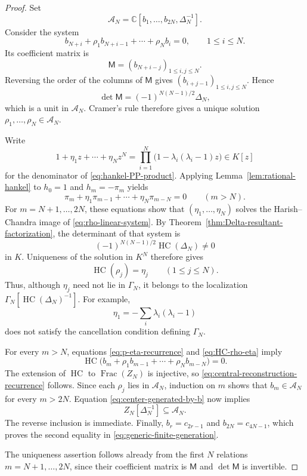 \documentclass[10pt,a4paper]{amsart}
\newcommand{\C}{\mathbb C}
\newcommand{\HC}{\operatorname{HC}}
\begin{document}
\begin{proof}
Set
\[
 \mathcal A_N
 =\C[b_1,\ldots,b_{2N},\Delta_N^{-1}].
\]
Consider the system
\begin{equation}
 b_{N+i}+\rho_1b_{N+i-1}+\cdots+\rho_Nb_i=0,
 \qquad 1\leq i\leq N.
 \label{eq:rho-linear-system}
\end{equation}
Its coefficient matrix is
\[
 \mathsf M=(b_{N+i-j})_{1\leq i,j\leq N}.
\]
Reversing the order of the columns of \(\mathsf M\) gives
\((b_{i+j-1})_{1\leq i,j\leq N}\).  Hence
\begin{equation}
 \det\mathsf M
 =(-1)^{N(N-1)/2}\Delta_N,
 \label{eq:M-determinant}
\end{equation}
which is a unit in \(\mathcal A_N\).  Cramer's rule therefore gives a
unique solution
\(\rho_1,\ldots,\rho_N\in\mathcal A_N\).

Write
\begin{equation}
 1+\eta_1z+\cdots+\eta_Nz^N
 =\prod_{i=1}^N
  \bigl(1-\lambda_i(\lambda_i-1)z\bigr)
 \in K[z]
 \label{eq:eta-denominator}
\end{equation}
for the denominator of \eqref{eq:hankel-PP-product}.  Applying
Lemma~\ref{lem:rational-hankel} to
\(h_0=1\) and \(h_m=-\pi_m\) yields
\begin{equation}
 \pi_m+\eta_1\pi_{m-1}+\cdots+\eta_N\pi_{m-N}=0
 \qquad(m>N).
 \label{eq:p-eta-recurrence}
\end{equation}
For \(m=N+1,\ldots,2N\), these equations show that
\((\eta_1,\ldots,\eta_N)\) solves the Harish--Chandra image of
\eqref{eq:rho-linear-system}.  By
Theorem~\ref{thm:Delta-resultant-factorization}, the determinant of that system is
\[
 (-1)^{N(N-1)/2}\HC(\Delta_N)\neq0
\]
in \(K\).  Uniqueness of the solution in \(K^N\) therefore gives
\begin{equation}
 \HC(\rho_j)=\eta_j
 \qquad(1\leq j\leq N).
 \label{eq:HC-rho-eta}
\end{equation}
Thus, although \(\eta_j\) need not lie in \(\Gamma_N\), it belongs to
the localization
\(\Gamma_N[\HC(\Delta_N)^{-1}]\).  For example,
\[
 \eta_1=-\sum_i\lambda_i(\lambda_i-1)
\]
does not satisfy the cancellation condition defining \(\Gamma_N\).

For every \(m>N\), equations \eqref{eq:p-eta-recurrence} and
\eqref{eq:HC-rho-eta} imply
\[
 \HC\bigl(
  b_m+\rho_1b_{m-1}+\cdots+\rho_Nb_{m-N}
 \bigr)=0.
\]
The extension of \(\HC\) to \(\operatorname{Frac}(Z_N)\) is injective,
so \eqref{eq:central-reconstruction-recurrence} follows.  Since each
\(\rho_j\) lies in \(\mathcal A_N\), induction on \(m\) shows that
\(b_m\in\mathcal A_N\) for every \(m>2N\).  Equation
\eqref{eq:center-generated-by-b} now implies
\[
 Z_N[\Delta_N^{-1}]\subseteq\mathcal A_N.
\]
The reverse inclusion is immediate.  Finally,
\(b_r=c_{2r-1}\) and \(b_{2N}=c_{4N-1}\), which proves the second
equality in \eqref{eq:generic-finite-generation}.

The uniqueness assertion follows already from the first \(N\)
relations \(m=N+1,\ldots,2N\), since their coefficient matrix is
\(\mathsf M\) and \(\det\mathsf M\) is invertible.
\end{proof}
\end{document}

